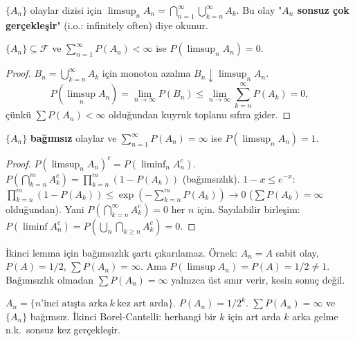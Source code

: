 \begin{tanim}
$\{A_n\}$ olaylar dizisi için $\limsup_n A_n = \bigcap_{n=1}^\infty \bigcup_{k=n}^\infty A_k$.
Bu olay "\textbf{$A_n$ sonsuz çok gerçekleşir}" (i.o.: infinitely often) diye okunur.
\end{tanim}

\begin{teorem}
\label{thm:bc1}
$\{A_n\} \subseteq \mathcal{F}$ ve $\sum_{n=1}^\infty P(A_n) < \infty$ ise
$P(\limsup_n A_n) = 0$.
\end{teorem}

\begin{proof}
$B_n = \bigcup_{k=n}^\infty A_k$ için monoton azalma $B_n \downarrow \limsup_n A_n$.
\[
  P(\limsup_n A_n) = \lim_{n\to\infty} P(B_n) \leq \lim_{n\to\infty} \sum_{k=n}^\infty P(A_k) = 0,
\]
çünkü $\sum P(A_n) < \infty$ olduğundan kuyruk toplamı sıfıra gider.
\end{proof}

\begin{teorem}
\label{thm:bc2}
$\{A_n\}$ \textbf{bağımsız} olaylar ve $\sum_{n=1}^\infty P(A_n) = \infty$ ise
$P(\limsup_n A_n) = 1$.
\end{teorem}

\begin{proof}
$P(\limsup_n A_n)^c = P(\liminf_n A_n^c)$.
$P\!\left(\bigcap_{k=n}^m A_k^c\right) = \prod_{k=n}^m (1-P(A_k))$ (bağımsızlık).
$1 - x \leq e^{-x}$: $\prod_{k=n}^m (1-P(A_k)) \leq \exp\!\left(-\sum_{k=n}^m P(A_k)\right) \to 0$
($\sum P(A_k) = \infty$ olduğundan). Yani $P(\bigcap_{k=n}^\infty A_k^c) = 0$ her $n$ için.
Sayılabilir birleşim: $P(\liminf A_n^c) = P(\bigcup_n \bigcap_{k\geq n} A_k^c) = 0$.
\end{proof}

\begin{hataanalizi}
İkinci lemma için bağımsızlık şartı çıkarılamaz.
Örnek: $A_n = A$ sabit olay, $P(A) = 1/2$, $\sum P(A_n) = \infty$.
Ama $P(\limsup A_n) = P(A) = 1/2 \neq 1$.
Bağımsızlık olmadan $\sum P(A_n) = \infty$ yalnızca üst sınır verir, kesin sonuç değil.
\end{hataanalizi}

\begin{ornek}
$A_n = \{n\text{'inci atışta arka}\ k\ \text{kez art arda}\}$.
$P(A_n) = 1/2^k$. $\sum P(A_n) = \infty$ ve $\{A_n\}$ bağımsız.
İkinci Borel-Cantelli: herhangi bir $k$ için art arda $k$ arka gelme n.k.\ sonsuz kez gerçekleşir.
\end{ornek}


